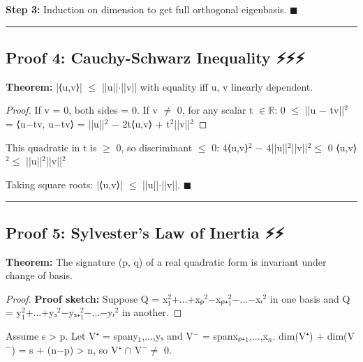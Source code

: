 \documentclass[12pt,a4paper,openany]{book}
\begin{document}
{{\textbf{Step 3:} Induction on dimension to get full orthogonal eigenbasis. $\blacksquare$

\bigskip\noindent\rule{\textwidth}{0.4pt}\bigskip

\subsection{Proof 4: Cauchy-Schwarz Inequality ⚡⚡⚡}

\begin{tcolorbox}[colback=lightblue,colframe=thmblue,title=\textbf{Theorem},breakable,boxrule=1.5pt]
\textbf{Theorem:} |⟨u,v⟩| $\leq$ ||u||$\cdot$||v|| with equality iff u, v linearly dependent.
\end{tcolorbox}

\begin{proof}

If v = 0, both sides = 0. 
If v $\neq$ 0, for any scalar t $\in\mathbb{R}$:
0 $\leq$ ||u − tv||$^2$ = ⟨u−tv, u−tv⟩ = ||u||$^2$ − 2t⟨u,v⟩ + t$^2$||v||$^2$
\end{proof}

This quadratic in t is $\geq$ 0, so discriminant $\leq$ 0:
4⟨u,v⟩$^2$ − 4||u||$^2$||v||$^2\leq$ 0
⟨u,v⟩$^2\leq$ ||u||$^2$||v||$^2$

Taking square roots: |⟨u,v⟩| $\leq$ ||u||$\cdot$||v||. $\blacksquare$

\bigskip\noindent\rule{\textwidth}{0.4pt}\bigskip

\subsection{Proof 5: Sylvester's Law of Inertia ⚡⚡}

\begin{tcolorbox}[colback=lightblue,colframe=thmblue,title=\textbf{Theorem},breakable,boxrule=1.5pt]
\textbf{Theorem:} The signature (p, q) of a real quadratic form is invariant under change of basis.
\end{tcolorbox}

\begin{proof}
\textbf{Proof sketch:}
Suppose Q = x$_1^2$+...+xₚ$^2$−xₚ₊$_1^2$−...−xᵣ$^2$ in one basis and Q = y$_1^2$+...+yₛ$^2$−yₛ₊$_1^2$−...−yᵣ$^2$ in another.
\end{proof}

Assume s > p. Let V⁺ = span{y$_1$,...,yₛ} and V$^{-}$ = span{xₚ₊$_1$,...,x$_n$}.
dim(V⁺) + dim(V$^{-}$) = s + (n−p) > n, so V⁺ $\cap$ V$^{-}\neq$ {0}.

}}
\end{document}
